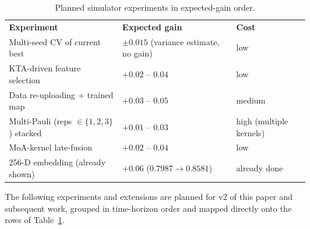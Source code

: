 \documentclass[twocolumn,10pt]{article}
\begin{document}
\begin{table}[h]
\centering
\caption{Planned simulator experiments in expected-gain order.}
\label{tab:roadmap}
\small
\setlength{\tabcolsep}{6pt}
\renewcommand{\arraystretch}{1.25}
\begin{tabularx}{\columnwidth}{@{}>{\raggedright\arraybackslash}X>{\raggedleft\arraybackslash}p{}>{\raggedright\arraybackslash}p{}@{}}
\rowcolor{tabheader}
\textbf{Experiment} & \textbf{Expected gain} & \textbf{Cost} \\
\rowcolor{tabrowlight} Multi-seed CV of current best         & $\pm 0.015$ (variance estimate, no gain) & low \\
\rowcolor{tabrowdark}  KTA-driven feature selection          & $+0.02$ -- $0.04$                      & low \\
\rowcolor{tabrowlight} Data re-uploading + trained map       & $+0.03$ -- $0.05$                      & medium \\
\rowcolor{tabrowdark}  Multi-Pauli (reps $\in\{1,2,3\}$) stacked & $+0.01$ -- $0.03$                  & high (multiple kernels) \\
\rowcolor{tabrowlight} MoA-kernel late-fusion                & $+0.02$ -- $0.04$                      & low \\
\rowcolor{tabrowdark}  256-D embedding (already shown)       & $+0.06$ ($0.7987 \to 0.8581$)          & already done \\
\end{tabularx}
\end{table}

The following experiments and extensions are planned for v2 of this paper and subsequent work, grouped in time-horizon order and mapped directly onto the rows of Table~\ref{tab:roadmap}.
\end{document}
